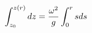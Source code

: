 \documentclass[preview]{standalone}
\begin{document}
\begin{align*}
\special{dvisvgm:raw <g id='unique000'>}\int_{z_0}^{z(r)} dz = \frac{\omega^2}{g} \int_0^r s ds\special{dvisvgm:raw </g>}
\end{align*}
\end{document}
